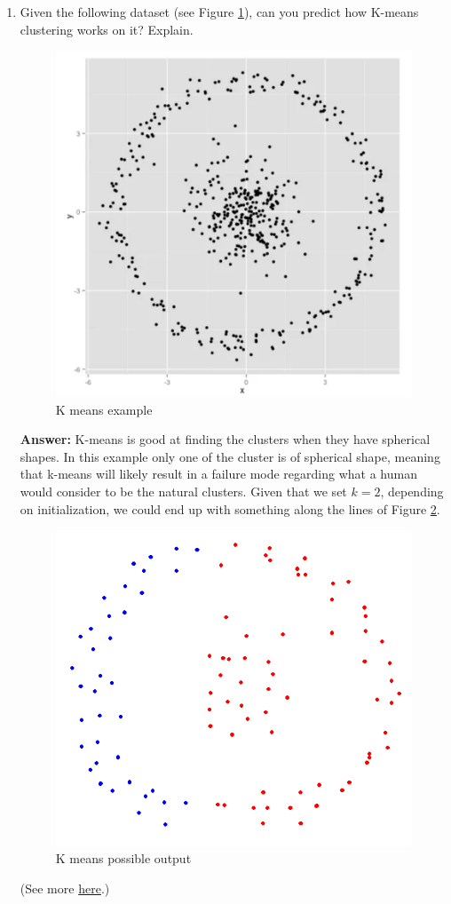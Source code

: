 \documentclass{article}
\newenvironment{QandA}{\begin{enumerate}[label=\arabic*.]}{\end{enumerate}}
\newenvironment{InnerQandA}{\begin{enumerate}[label=\roman*.]}{\end{enumerate}}
\newenvironment{answer}{\par\normalfont \textbf{Answer:}}{}
\begin{document}
\begin{QandA}
\begin{InnerQandA}
        \item Given the following dataset (see Figure \ref{fig:k-means-example}), can you predict how K-means clustering works on it? Explain.
        \begin{figure}[h!]
            \centering
            \includegraphics[width=0.4\columnwidth]{img/k-means-example.png}
            \caption{K means example}
            \label{fig:k-means-example}
        \end{figure}
        
        \begin{answer}
            K-means is good at finding the clusters when they have spherical shapes. In this example only one of the cluster is of spherical shape, meaning that k-means will likely result in a failure mode regarding what a human would consider to be the natural clusters. Given that we set $k=2$, depending on initialization, we could end up with something along the lines of Figure \ref{fig:k-means-possible-sol}.

            \begin{figure}[h!]
                \centering
                \includegraphics[width=0.4\columnwidth]{img/k-means-possible-sol.png}
                \caption{K means possible output}
                \label{fig:k-means-possible-sol}
            \end{figure}
            (See more \href{https://towardsdatascience.com/k-means-clustering-algorithm-applications-evaluation-methods-and-drawbacks-aa03e644b48a}{here}.)
        \end{answer}
    \end{InnerQandA}


\end{QandA}
\end{document}
